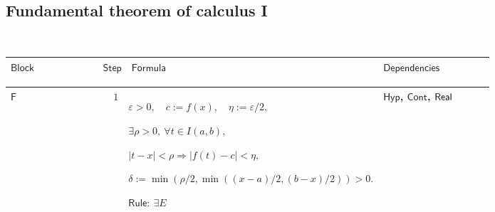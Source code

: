 \documentclass[12pt,reqno]{amsart}
\theoremstyle{blueplain}
\numberwithin{equation}{section}
\newlength{\FTCOneColumnBody}
\begin{document}
{\scriptsize \ }

\subsection{\protect\scriptsize Fundamental theorem of calculus I}

{\scriptsize {\ }}

{\scriptsize \setlength{\parskip}{0pt}\nointerlineskip
\noindent 
\begin{tabular}{|@{}>{\centering\arraybackslash}m{\FTCOneColumnBody}|}
\hline
$\displaystyle \mathsf{FTC1Proof}$ \\ \hline
\end{tabular}%
}

{\scriptsize \setlength{\parskip}{0pt}\nointerlineskip
\noindent 
\begin{tabular}{|@{}>{\centering\arraybackslash}m{0.10658\linewidth}|>{\centering\arraybackslash}m{0.03553\linewidth}|>{\centering\arraybackslash}m{0.52105\linewidth}|>{\centering\arraybackslash}m{0.23684\linewidth}|}
\hline
$\displaystyle \mathsf{Block}$ & $\displaystyle \mathsf{Step}$ & $%
\displaystyle \mathsf{Formula}$ & $\displaystyle \mathsf{Dependencies}$ \\ 
\hline
\end{tabular}%
}

{\scriptsize \setlength{\parskip}{0pt}\nointerlineskip
\noindent 
\begin{tabular}{|@{}>{\centering\arraybackslash}m{\FTCOneColumnBody}|}
\hline
$\displaystyle \mathsf{Context\_F}:=$\par$\displaystyle \mathsf{H1}%
(f;a,b),\quad x\in I^\circ(a,b).$ \\ \hline
\end{tabular}%
}

{\scriptsize \setlength{\parskip}{0pt}\nointerlineskip
\noindent 
\begin{tabular}{|@{}>{\centering\arraybackslash}m{0.10658\linewidth}|>{\centering\arraybackslash}m{0.03553\linewidth}|>{\centering\arraybackslash}m{0.52105\linewidth}|>{\centering\arraybackslash}m{0.23684\linewidth}|}
\hline
\hypertarget{proof:F1}{$\displaystyle \mathsf{F}$} & $\displaystyle 1$ & $%
\displaystyle \varepsilon>0,\quad c:=f(x),\quad\eta:=\varepsilon/2,$\par$%
\displaystyle \exists\rho>0,\ \forall t\in I(a,b),$\par$\displaystyle %
|t-x|<\rho\Rightarrow|f(t)-c|<\eta,$\par$\displaystyle \delta:=\min(\rho/2,%
\min((x-a)/2,(b-x)/2))>0.$\par$\displaystyle \mathsf{Rule}:\ \exists E$ & 
\hyperlink{def:Hyp}{$\displaystyle \mathsf{Hyp}$}, \hyperlink{def:Cont}{$%
\displaystyle \mathsf{Cont}$}, \hyperlink{ax:Real}{$\displaystyle \mathsf{%
Real}$} \\ \hline
\end{tabular}%
}
\end{document}
